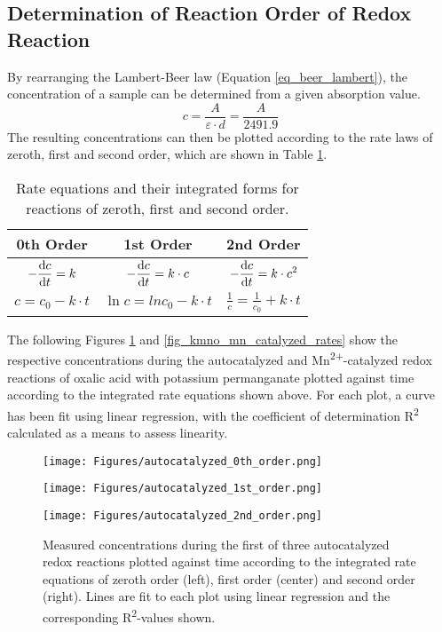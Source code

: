 \documentclass[titlepage]{article}
\begin{document}
\newpage
\subsection{Determination of Reaction Order of Redox Reaction}
By rearranging the Lambert-Beer law (Equation \ref{eq_beer_lambert}), the concentration of a sample can be determined from a given absorption value.
%
\begin{equation} \label{eq_concentration_from_attenuation}
    c = \frac{A}{\varepsilon \cdot d} = \frac{A}{2491.9}
\end{equation}
%
The resulting concentrations can then be plotted according to the rate laws of zeroth, first and second order, which are shown in Table \ref{tb_rate_laws}.
%
\begin{table}[H]
    \centering
    \caption{Rate equations and their integrated forms for reactions of zeroth, first and second order.}
    \label{tb_rate_laws}
    \begin{tabular}{|c|c|c|}
        \hline
        \textbf{0th Order} & \textbf{1st Order} & \textbf{2nd Order}
        \\
        \hline
        \(\displaystyle -\odv{c}{t} = k\) & \(\displaystyle -\odv{c}{t} = k \cdot c\) & \(\displaystyle -\odv{c}{t} = k \cdot c^2\)
        \\
        \hline
        \(\displaystyle c = c_0 - k \cdot t\) & \(\displaystyle \ln{c} = ln{c_0} - k \cdot t\) & \(\displaystyle \frac{1}{c} = \frac{1}{c_0} + k \cdot t\)
        \\
        \hline
    \end{tabular}
\end{table}
%
\noindent The following Figures \ref{fig_kmno_autocatalyzed_rates} and \ref{fig_kmno_mn_catalyzed_rates} show the respective concentrations during the autocatalyzed and Mn\textsuperscript{2+}-catalyzed redox reactions of oxalic acid with potassium permanganate plotted against time according to the integrated rate equations shown above. For each plot, a curve has been fit using linear regression, with the coefficient of determination R\textsuperscript{2} calculated as a means to assess linearity.
%
\begin{figure}[H]
    \centering
    \begin{minipage}[c]{0.32\textwidth}
        \texttt{[image: Figures/autocatalyzed\_0th\_order.png]}
    \end{minipage}
    \begin{minipage}[c]{0.32\textwidth}
        \texttt{[image: Figures/autocatalyzed\_1st\_order.png]}
    \end{minipage}
    \begin{minipage}[c]{0.32\textwidth}
        \texttt{[image: Figures/autocatalyzed\_2nd\_order.png]}
    \end{minipage}
    \caption{Measured concentrations during the first of three autocatalyzed redox reactions plotted against time according to the integrated rate equations of zeroth order (left), first order (center) and second order (right). Lines are fit to each plot using linear regression and the corresponding R\textsuperscript{2}-values shown.}
    \label{fig_kmno_autocatalyzed_rates}
\end{figure}
\end{document}
